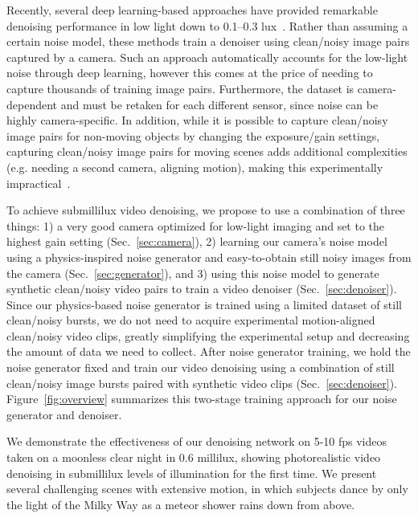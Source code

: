 \documentclass[final]{cvpr}
\begin{document}
Recently, several deep learning-based approaches have provided remarkable denoising performance in low light down to 0.1--0.3 lux~\cite{chen2018learning, chen2019seeing}. Rather than assuming a certain noise model, these methods train a denoiser using clean/noisy image pairs captured by a camera. Such an approach automatically accounts for the low-light noise through deep learning, however this comes at the price of needing to capture thousands of training image pairs. Furthermore, the dataset is camera-dependent and must be retaken for each different sensor, since noise can be highly camera-specific. In addition, while it is possible to capture clean/noisy image pairs for non-moving objects by changing the exposure/gain settings, capturing clean/noisy image pairs for moving scenes adds additional complexities (e.g. needing a second camera, aligning motion), making this experimentally impractical~\cite{jiang2019learning}.




To achieve submillilux video denoising, we propose to use a combination of three things: 1) a very good camera optimized for low-light imaging and set to the highest gain setting (Sec.~\ref{sec:camera}), 2) learning our camera's noise model using a physics-inspired noise generator and easy-to-obtain still noisy images from the camera (Sec.~\ref{sec:generator}), and 3) using this noise model to generate synthetic clean/noisy video pairs to train a video denoiser (Sec.~\ref{sec:denoiser}). Since our physics-based noise generator is trained using a limited dataset of still clean/noisy bursts, we do not need to acquire experimental motion-aligned clean/noisy video clips, greatly simplifying the experimental setup and decreasing the amount of data we need to collect. After noise generator training, we hold the noise generator fixed and train our video denoising using a combination of still clean/noisy image bursts paired with synthetic video clips (Sec.~\ref{sec:denoiser}). Figure~\ref{fig:overview} summarizes this two-stage training approach for our noise generator and denoiser.












We demonstrate the effectiveness of our denoising network on 5-10 fps videos taken on a moonless clear night in 0.6 millilux, showing photorealistic video denoising in submillilux levels of illumination for the first time. We present several challenging scenes with extensive motion, in which subjects dance by only the light of the Milky Way as a meteor shower rains down from above. 
\end{document}

